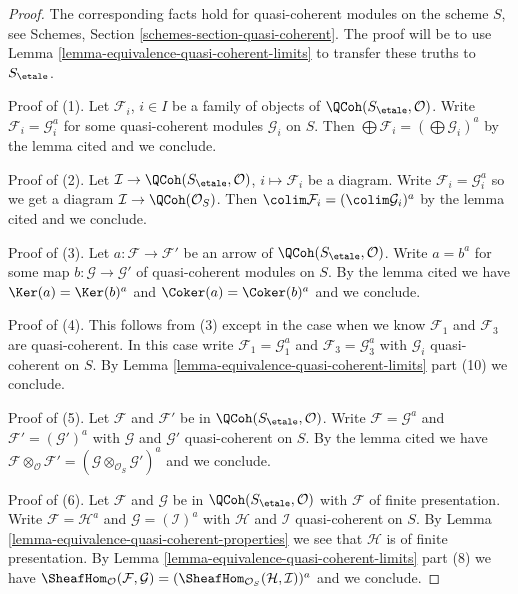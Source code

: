\begin{proof}
The corresponding facts hold for quasi-coherent modules on the scheme $S$,
see Schemes, Section \ref{schemes-section-quasi-coherent}. The proof will
be to use Lemma \ref{lemma-equivalence-quasi-coherent-limits} to transfer
these truths to $S_\etale$.

\medskip\noindent
Proof of (1). Let $\mathcal{F}_i$, $i \in I$ be a family of objects of
$\QCoh(S_\etale, \mathcal{O})$. Write $\mathcal{F}_i = \mathcal{G}_i^a$
for some quasi-coherent modules $\mathcal{G}_i$ on $S$.
Then $\bigoplus \mathcal{F}_i = (\bigoplus \mathcal{G}_i)^a$ by
the lemma cited and we conclude.

\medskip\noindent
Proof of (2). Let $\mathcal{I} \to \QCoh(S_\etale, \mathcal{O})$,
$i \mapsto \mathcal{F}_i$ be a diagram. Write
$\mathcal{F}_i = \mathcal{G}_i^a$ so we get a diagram
$\mathcal{I} \to \QCoh(\mathcal{O}_S)$.
Then $\colim \mathcal{F}_i = (\colim \mathcal{G}_i)^a$ by
the lemma cited and we conclude.

\medskip\noindent
Proof of (3). Let $a : \mathcal{F} \to \mathcal{F}'$
be an arrow of $\QCoh(S_\etale, \mathcal{O})$.
Write $a = b^a$ for some map $b : \mathcal{G} \to \mathcal{G}'$
of quasi-coherent modules on $S$. By the lemma cited
we have $\Ker(a) = \Ker(b)^a$ and $\Coker(a) = \Coker(b)^a$
and we conclude.

\medskip\noindent
Proof of (4). This follows from (3) except in the case when
we know $\mathcal{F}_1$ and $\mathcal{F}_3$ are quasi-coherent.
In this case write $\mathcal{F}_1 = \mathcal{G}_1^a$
and $\mathcal{F}_3 = \mathcal{G}_3^a$ with
$\mathcal{G}_i$ quasi-coherent on $S$.
By Lemma \ref{lemma-equivalence-quasi-coherent-limits} part (10)
we conclude.

\medskip\noindent
Proof of (5). Let $\mathcal{F}$ and $\mathcal{F}'$
be in $\QCoh(S_\etale, \mathcal{O})$.
Write $\mathcal{F} = \mathcal{G}^a$
and $\mathcal{F}' = (\mathcal{G}')^a$
with $\mathcal{G}$ and $\mathcal{G}'$ quasi-coherent on $S$.
By the lemma cited we have
$\mathcal{F} \otimes_\mathcal{O} \mathcal{F}' =
(\mathcal{G} \otimes_{\mathcal{O}_S} \mathcal{G}')^a$
and we conclude.

\medskip\noindent
Proof of (6). Let $\mathcal{F}$ and $\mathcal{G}$
be in $\QCoh(S_\etale, \mathcal{O})$ with $\mathcal{F}$
of finite presentation. Write $\mathcal{F} = \mathcal{H}^a$
and $\mathcal{G} = (\mathcal{I})^a$
with $\mathcal{H}$ and $\mathcal{I}$ quasi-coherent on $S$.
By Lemma \ref{lemma-equivalence-quasi-coherent-properties}
we see that $\mathcal{H}$ is of finite presentation.
By Lemma \ref{lemma-equivalence-quasi-coherent-limits} part (8)
we have
$\SheafHom_\mathcal{O}(\mathcal{F}, \mathcal{G}) =
(\SheafHom_{\mathcal{O}_S}(\mathcal{H}, \mathcal{I}))^a$
and we conclude.
\end{proof}

